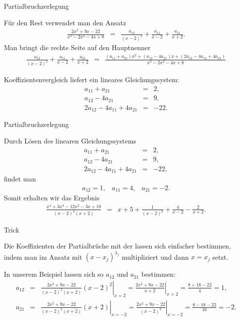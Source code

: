 \documentclass[german]{beamer}
\newcommand{\bq}{\begin{eqnarray*}}
\newcommand{\eq}{\end{eqnarray*}}
\newcommand{\superalert}[1]{{\color{MyYellowOrange}{#1}}}
\begin{document}
\begin{frame}{Partialbruchzerlegung}

F\"ur den Rest verwendet man den Ansatz
\bq
\frac{2x^2+9x-22}{x^3-2x^2-4x+8}
& = & \frac{a_{12}}{(x-2)^2} + \frac{a_{11}}{x-2} + \frac{a_{21}}{x+2}.
\eq
Man bringt die rechte Seite auf den Hauptnenner
{\footnotesize
\bq
\frac{a_{12}}{(x-2)^2} + \frac{a_{11}}{x-2} + \frac{a_{21}}{x+2}
 & = &
 \frac{(a_{11}+a_{21})x^2 + (a_{12}-4a_{21})x+(2a_{12}-4a_{11}+4a_{21})}{x^3-2x^2-4x+8}
\eq
}

Koeffizientenvergleich liefert ein lineares Gleichungssystem:
\bq
 a_{11}+a_{21} & = & 2,
 \nonumber \\
 a_{12}-4a_{21} & = & 9,
 \nonumber \\
 2a_{12}-4a_{11}+4a_{21} & = & -22.
\eq

\end{frame}

\begin{frame}{Partialbruchzerlegung}

Durch L\"osen des linearen Gleichungssystems
\bq
 a_{11}+a_{21} & = & 2,
 \nonumber \\
 a_{12}-4a_{21} & = & 9,
 \nonumber \\
 2a_{12}-4a_{11}+4a_{21} & = & -22,
\eq
findet man
\bq
 a_{12} = 1, \;\;\; a_{11}=4, \;\;\; a_{21}=-2.
\eq
Somit erhalten wir das Ergebnis
\bq
\frac{x^4+3x^3-12x^2-3x+18}{(x-2)^2(x+2)}
 & = & 
 x + 5 + \frac{1}{(x-2)^2} + \frac{4}{x-2} - \frac{2}{x+2}.
\eq

\end{frame}

\begin{frame}{Trick}

Die Koeffizienten der Partialbr\"uche mit der \superalert{h\"ochsten Potenz einer Nullstelle} lassen
sich einfacher bestimmen, indem man im Ansatz mit $(x-x_j)^{\lambda_j}$ multipliziert und dann
$x=x_j$ setzt. 

\vspace*{4mm}
In unserem Beispiel lassen sich so $a_{12}$ und $a_{21}$ bestimmen:
{\scriptsize
\bq
 a_{12} & = & \left. \frac{2x^2+9x-22}{(x-2)^2(x+2)} (x-2)^2 \right|_{x=2}
 = \left. \frac{2x^2+9x-22}{x+2} \right|_{x=2}
 = \frac{8+18-22}{4} = 1,
 \nonumber \\
 a_{21} & = & \left. \frac{2x^2+9x-22}{(x-2)^2(x+2)} (x+2) \right|_{x=-2}
 = \left. \frac{2x^2+9x-22}{(x-2)^2} \right|_{x=-2}
 = \frac{8-18-22}{16} = -2.
\eq
}

\end{frame}
\end{document}
